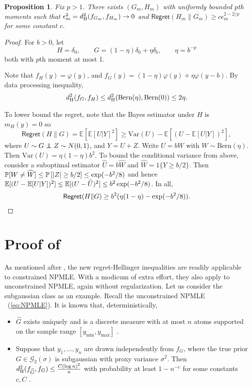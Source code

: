 \documentclass[letterpaper,11pt]{article}
\newcommand{\eqref}[1]{~(\ref{#1})}
\def\exp{\mathop{\rm exp}}
\def\Var{\mathrm{Var}}
\newcommand{\Expect}{\mathbb{E}}
\newcommand{\Prob}{\mathbb{P}}
\newcommand{\prob}[1]{\mathbb{P}\left[#1\right]}
\newcommand{\hellinger}{d_{\rm H}}
\newcommand{\var}{\Var}
\newcommand\indep{\protect\mathpalette{\protect\independenT}{\perp}}
\def\independenT#1#2{\mathrel{\rlap{$#1#2$}\mkern2mu{#1#2}}}
\newcommand{\Bern}{\text{Bern}}
\newcommand{\indc}[1]{{1\{{#1}\}}}
\newcommand{\calG}{{\mathcal{G}}}
\newtheorem{prop}[theorem]{Proposition}
\theoremstyle{definition}
\newcommand{\Regret}{\mathsf{Regret}}
\renewcommand{\hat}{\widehat}
\begin{document}
\begin{prop}\label{prop:moment-counterexample}
Fix $p > 1$. There exists $(G_m,H_m)$ with uniformly bounded $p$th moments such that
$\epsilon_m^2 = \hellinger^2 (f_ {G_m},f_ {H_m}) \to 0$ and
$
\Regret(H_m\|G_m) \geq c \epsilon_m^{2-2/p}
$
for some constant $c$.
\end{prop}

\begin{proof}
For $b>0$, let
\[H=\delta_0,
\qquad
G=(1-\eta)\delta_0+\eta\delta_b,
\qquad
\eta=b^{-p}
\]
both with $p$th moment at most 1.

Note that $f_H(y)=\varphi(y)$, and $
f_G(y)=(1-\eta)\varphi(y)+\eta \varphi(y-b)$.
By data processing inequality,
\[
\hellinger^2(f_G,f_H)
\le \hellinger^2(\Bern(\eta),\Bern(0))
\le 2\eta.
\]

To lower bound the regret,
note that the Bayes estimator under $H$ is $m_H(y)=0$ so
\[
\Regret(H\|G)
= \Expect[\Expect[U|Y]^2]
\ge \var(U) - \Expect[(U-\Expect[U|Y])^2],
\]
where $U\sim G\indep Z\sim N(0,1)$, and $Y=U+Z$.
Write $U=b W$ with $W \sim \Bern(\eta)$.
Then $\Var(U)=\eta(1-\eta)b^2$. To bound the conditional variance from above, consider a suboptimal estimator $\hat U= b \hat W$ and $\hat W = \indc{Y\geq b/2}$.
Then
$\Prob[W\neq \hat W] \leq \prob{|Z| \geq b/2} \leq \exp(-b^2/8)$ and hence
$\Expect[(U-\Expect[U|Y])^2]
\leq \Expect[(U-\hat U)^2]
\leq  b^2 \exp(-b^2/8)$.
In all,
\[
\Regret(H\|G) \geq b^2(\eta(1-\eta) - \exp(-b^2/8)).
\]
\end{proof}

\section{Proof of }
\label{app:NPMLE}

As mentioned after , the new regret-Hellinger inequalities are  readily applicable to constrained NPMLE. With a modicum of extra effort, they also apply to unconstrained NPMLE, again without regularization. Let us consider the  subgaussian class as an example. Recall the unconstrained NPMLE \eqref{eq:NPMLE}.
It is known that, deterministically,
\begin{itemize}
    \item $\hat G$ exists uniquely and is a discrete measure with at most $n$ atoms supported on the sample range $[y_{\min},y_{\max}]$ \cite{lindsay1983geometry1}.

    \item Suppose that $y_1,\ldots,y_n$ are drawn independently from $f_G$, where the true
    prior 
    $G \in \calG_2(\sigma)$ is subgaussian with proxy variance $\sigma^2$. Then $\hellinger^2(f_
    {\hat
    G},f_G) \leq \frac{C (\log n)^2}{n}$ with probability at least $1-n^{-c}$ for some constants $c,C$ \cite{Zhang_2009}.
\end{itemize}
\end{document}
